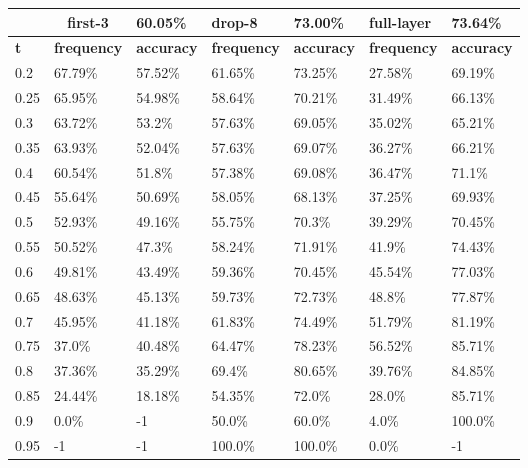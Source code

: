 
\begin{table}[t]
\centering
\begin{tabular}{lllllll}
\hline
\multicolumn{1}{c}{} & \multicolumn{1}{c}{first-3} & \multicolumn{1}{l|}{60.05\%} & drop-8 & \multicolumn{1}{l|}{73.00\%} & full-layer & 73.64\% \\ \hline
\multicolumn{1}{l|}{\textbf{t}} & \textbf{frequency} & \multicolumn{1}{l|}{\textbf{accuracy}} & \textbf{frequency} & \multicolumn{1}{l|}{\textbf{accuracy}} & \textbf{frequency} & \textbf{accuracy} \\ \hline	\multicolumn{1}{l|}{0.2}&  67.79\% & \multicolumn{1}{l|}{57.52\%}& 61.65\% & \multicolumn{1}{l|}{73.25\%}& 27.58\% & 69.19\%\\ 
\multicolumn{1}{l|}{0.25}&  65.95\% & \multicolumn{1}{l|}{54.98\%}& 58.64\% & \multicolumn{1}{l|}{70.21\%}& 31.49\% & 66.13\%\\ 
\multicolumn{1}{l|}{0.3}&  63.72\% & \multicolumn{1}{l|}{53.2\%}& 57.63\% & \multicolumn{1}{l|}{69.05\%}& 35.02\% & 65.21\%\\ 
\multicolumn{1}{l|}{0.35}&  63.93\% & \multicolumn{1}{l|}{52.04\%}& 57.63\% & \multicolumn{1}{l|}{69.07\%}& 36.27\% & 66.21\%\\ 
\multicolumn{1}{l|}{0.4}&  60.54\% & \multicolumn{1}{l|}{51.8\%}& 57.38\% & \multicolumn{1}{l|}{69.08\%}& 36.47\% & 71.1\%\\ 
\multicolumn{1}{l|}{0.45}&  55.64\% & \multicolumn{1}{l|}{50.69\%}& 58.05\% & \multicolumn{1}{l|}{68.13\%}& 37.25\% & 69.93\%\\ 
\multicolumn{1}{l|}{0.5}&  52.93\% & \multicolumn{1}{l|}{49.16\%}& 55.75\% & \multicolumn{1}{l|}{70.3\%}& 39.29\% & 70.45\%\\ 
\multicolumn{1}{l|}{0.55}&  50.52\% & \multicolumn{1}{l|}{47.3\%}& 58.24\% & \multicolumn{1}{l|}{71.91\%}& 41.9\% & 74.43\%\\ 
\multicolumn{1}{l|}{0.6}&  49.81\% & \multicolumn{1}{l|}{43.49\%}& 59.36\% & \multicolumn{1}{l|}{70.45\%}& 45.54\% & 77.03\%\\ 
\multicolumn{1}{l|}{0.65}&  48.63\% & \multicolumn{1}{l|}{45.13\%}& 59.73\% & \multicolumn{1}{l|}{72.73\%}& 48.8\% & 77.87\%\\ 
\multicolumn{1}{l|}{0.7}&  45.95\% & \multicolumn{1}{l|}{41.18\%}& 61.83\% & \multicolumn{1}{l|}{74.49\%}& 51.79\% & 81.19\%\\ 
\multicolumn{1}{l|}{0.75}&  37.0\% & \multicolumn{1}{l|}{40.48\%}& 64.47\% & \multicolumn{1}{l|}{78.23\%}& 56.52\% & 85.71\%\\ 
\multicolumn{1}{l|}{0.8}&  37.36\% & \multicolumn{1}{l|}{35.29\%}& 69.4\% & \multicolumn{1}{l|}{80.65\%}& 39.76\% & 84.85\%\\ 
\multicolumn{1}{l|}{0.85}&  24.44\% & \multicolumn{1}{l|}{18.18\%}& 54.35\% & \multicolumn{1}{l|}{72.0\%}& 28.0\% & 85.71\%\\ 
\multicolumn{1}{l|}{0.9}&  0.0\% & \multicolumn{1}{l|}{-1}& 50.0\% & \multicolumn{1}{l|}{60.0\%}& 4.0\% & 100.0\%\\ 
\multicolumn{1}{l|}{0.95}&  -1 & \multicolumn{1}{l|}{-1}& 100.0\% & \multicolumn{1}{l|}{100.0\%}& 0.0\% & -1\\ 


\end{tabular}
\end{table}
